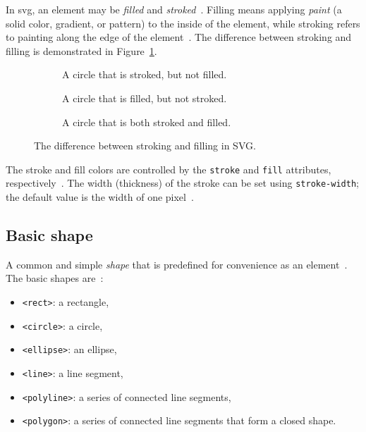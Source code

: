 In \gls{svg}, an element may be \emph{filled} and \emph{stroked}~\cite[Sec.~11.1]{svg11}. Filling means applying \emph{paint} (a solid color, gradient, or pattern) to the inside of the element, while stroking refers to painting along the edge of the element~\cite[Sec.~11.1]{svg11}. The difference between stroking and filling is demonstrated in Figure~\ref{fig:stroke-fill}.
\begin{figure}[H]
  \centering
  \begin{subfigure}[b]{0.3\textwidth}
    \centering
    \caption{A circle that is stroked, but not filled.}
  \end{subfigure}
  \hfill
  \begin{subfigure}[b]{0.3\textwidth}
    \centering
    \caption{A circle that is filled, but not stroked.}
  \end{subfigure}
  \hfill
  \begin{subfigure}[b]{0.3\textwidth}
    \centering
    \caption{A circle that is both stroked and filled.}
  \end{subfigure}
  \caption{The difference between stroking and filling in SVG.}
  \label{fig:stroke-fill}
\end{figure}

The stroke and fill colors are controlled by the \texttt{stroke} and \texttt{fill} attributes, respectively~\cite[Sec.~11.2]{svg11}. The width (thickness) of the stroke can be set using \texttt{stroke-width}; the default value is the width of one pixel~\cite[Sec.~11.4]{svg11}.

\subsection{Basic shape}

A common and simple \emph{shape} that is predefined for convenience as an element~\cite[Sec.~1.6]{svg11}. The basic shapes are~\cite[Sec.~1.6]{svg11}:
\begin{itemize}
    \item \texttt{<rect>}: a rectangle,
    \item \texttt{<circle>}: a circle,
    \item \texttt{<ellipse>}: an ellipse,
    \item \texttt{<line>}: a line segment,
    \item \texttt{<polyline>}: a series of connected line segments,
    \item \texttt{<polygon>}: a series of connected line segments that form a closed shape.
\end{itemize}

